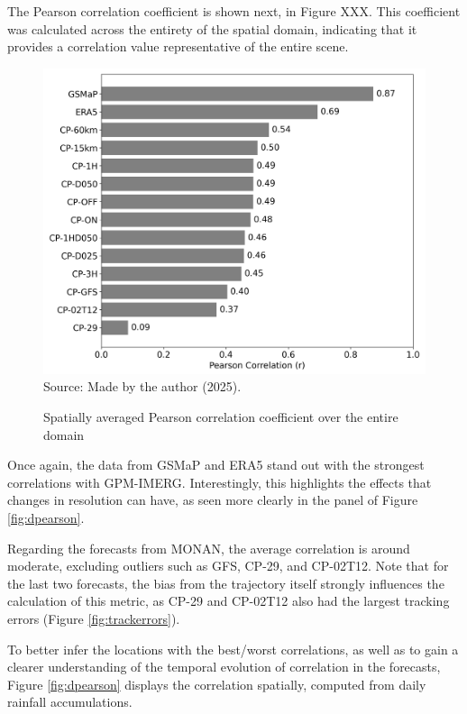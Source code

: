 The Pearson correlation coefficient is shown next, in Figure XXX. This coefficient was calculated across the entirety of the spatial domain, indicating that it provides a correlation value representative of the entire scene.

\begin{figure}[!ht]
	\centering
	\caption{Spatially averaged Pearson correlation coefficient over the entire domain} %
	\includegraphics[width=\textwidth]{docs/figuras/chapter5/pearson_correlation_bar_chart_FINAL.png} 
	\vspace{0.5em}
	Source: Made by the author (2025).  %
	\label{fig:pearson} %
\end{figure}

Once again, the data from GSMaP and ERA5 stand out with the strongest correlations with GPM-IMERG. Interestingly, this highlights the effects that changes in resolution can have, as seen more clearly in the panel of Figure \ref{fig:dpearson}.

Regarding the forecasts from MONAN, the average correlation is around moderate, excluding outliers such as GFS, CP-29, and CP-02T12. Note that for the last two forecasts, the bias from the trajectory itself strongly influences the calculation of this metric, as CP-29 and CP-02T12 also had the largest tracking errors (Figure \ref{fig:trackerrors}).

To better infer the locations with the best/worst correlations, as well as to gain a clearer understanding of the temporal evolution of correlation in the forecasts, Figure \ref{fig:dpearson} displays the correlation spatially, computed from daily rainfall accumulations.

